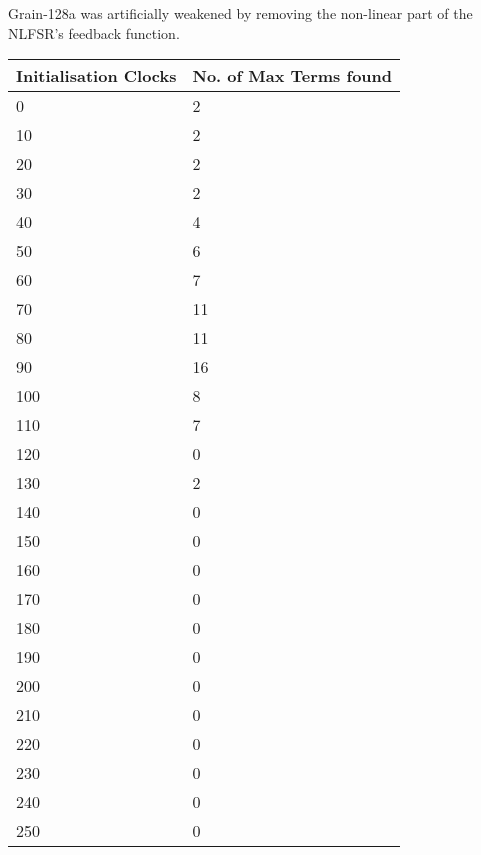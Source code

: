 \documentclass{report}
\begin{document}
\begin{appendices}
Grain-128a was artificially weakened by removing the non-linear part of the NLFSR's feedback function.
\begin{center}
    \begin{tabular}{| l | l |}
    \hline
    Initialisation Clocks & No. of Max Terms found\\ \hline
    0 & 2\\ \hline
    10 & 2\\ \hline
    20 & 2\\ \hline
    30 & 2\\ \hline
    40 & 4\\ \hline
    50 & 6\\ \hline
    60 & 7\\ \hline
    70 & 11\\ \hline
    80 & 11\\ \hline
    90 & 16\\ \hline
    100 & 8\\ \hline
    110 & 7\\ \hline
    120 & 0\\ \hline
    130 & 2\\ \hline
    140 & 0\\ \hline
    150 & 0\\ \hline
    160 & 0\\ \hline
    170 & 0\\ \hline
    180 & 0\\ \hline
    190 & 0\\ \hline
    200 & 0\\ \hline
    210 & 0\\ \hline
    220 & 0\\ \hline
    230 & 0\\ \hline
    240 & 0\\ \hline
    250 & 0\\ \hline
    \end{tabular}
\end{center}
\end{appendices}
\end{document}
